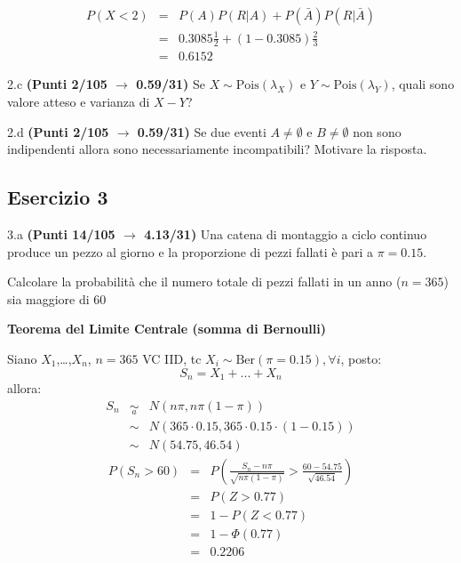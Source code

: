 \documentclass[
  11pt,
]{book}
\theoremstyle{mytheoremstyle}
\theoremstyle{mydefstyle}
\newenvironment{sol}
  {
  \begin{tcolorbox}[enhanced,breakable,arc=0.1mm,boxrule=1pt,colback=white,colframe=iblue,
  title=\bf \fontfamily{lmss}\selectfont \hspace{.5 cm} Soluzione,drop fuzzy shadow]

}{
\end{tcolorbox}
  }
\begin{document}
\begin{sol}
\begin{eqnarray*}
P(X<2) &=& P(A)P(R|A)+P(\bar A)P(R|\bar A)\\
&=& 0.3085\frac 12 + (1-0.3085)\frac 23\\
&=& 0.6152
\end{eqnarray*}

\end{sol}

2.c \textbf{(Punti 2/105 \(\rightarrow\) 0.59/31)} Se \(X\sim\text{Pois}(\lambda_X)\) e \(Y\sim\text{Pois}(\lambda_Y)\), quali sono valore atteso e varianza
di \(X-Y\)?

2.d \textbf{(Punti 2/105 \(\rightarrow\) 0.59/31)} Se due eventi \(A\ne\emptyset\) e \(B\ne\emptyset\) non sono indipendenti allora sono necessariamente incompatibili? Motivare la risposta.

\subsection{Esercizio 3}\label{esercizio-3-29}

3.a \textbf{(Punti 14/105 \(\rightarrow\) 4.13/31)} Una catena di montaggio a ciclo continuo produce un pezzo al giorno e la proporzione di pezzi fallati è pari
a \(\pi=0.15\).

Calcolare la probabilità che il numero totale di pezzi fallati in un anno (\(n=365\)) sia maggiore di 60

\begin{sol}
\textbf{Teorema del Limite Centrale (somma di Bernoulli)}

Siano \(X_1\),\ldots,\(X_n\), \(n=365\) VC IID, tc \(X_i\sim\text{Ber}(\pi=0.15)\)\(,\forall i\), posto:
\[
      S_n = X_1 + ... + X_n
      \]
allora:\begin{eqnarray*}
  S_n & \mathop{\sim}\limits_{a}& N(n\pi,n\pi(1-\pi)) \\
      &\sim & N(365\cdot0.15,365\cdot0.15\cdot(1-0.15)) \\
      &\sim & N(54.75,46.54)
  \end{eqnarray*}\begin{eqnarray*}
      P( S_n   >   60 ) 
        &=& P\left(  \frac { S_n  -  n\pi }{ \sqrt{n\pi(1-\pi)} }  >  \frac { 60  -  54.75 }{\sqrt{ 46.54 }} \right)  \\
                 &=& P\left(  Z   >   0.77 \right) \\    &=& 1-P(Z< 0.77 )\\ 
                 &=&  1-\Phi( 0.77 ) \\ &=&  0.2206 
      \end{eqnarray*}

\end{sol}
\end{document}
